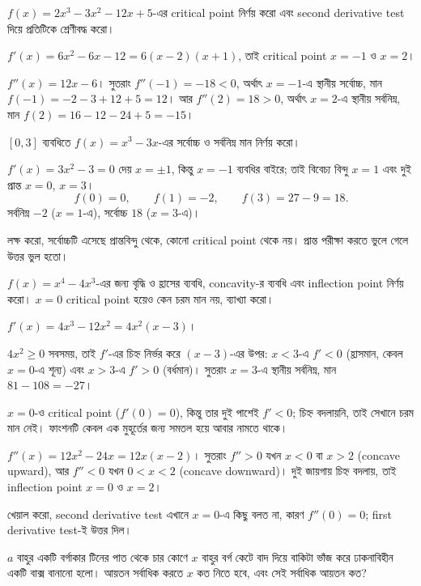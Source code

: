 \documentclass[11pt]{article}
\begin{document}
 $f(x) = 2x^{3} - 3x^{2} - 12x + 5$-এর critical point নির্ণয় করো এবং
second derivative test দিয়ে প্রতিটিকে শ্রেণীবদ্ধ করো।

\begin{sol}
$f'(x) = 6x^{2} - 6x - 12 = 6(x-2)(x+1)$, তাই critical point $x = -1$ ও
$x = 2$।

$f''(x) = 12x - 6$। সুতরাং $f''(-1) = -18 < 0$, অর্থাৎ $x=-1$-এ স্থানীয়
সর্বোচ্চ, মান $f(-1) = -2-3+12+5 = 12$। আর $f''(2) = 18 > 0$, অর্থাৎ $x=2$-এ
স্থানীয় সর্বনিম্ন, মান $f(2) = 16-12-24+5 = -15$।
\end{sol}

 $[0,3]$ ব্যবধিতে $f(x) = x^{3} - 3x$-এর সর্বোচ্চ ও সর্বনিম্ন মান
নির্ণয় করো।

\begin{sol}
$f'(x) = 3x^{2}-3 = 0$ দেয় $x = \pm 1$, কিন্তু $x=-1$ ব্যবধির বাইরে; তাই
বিবেচ্য বিন্দু $x = 1$ এবং দুই প্রান্ত $x = 0$, $x = 3$।
\[
  f(0) = 0, \qquad f(1) = -2, \qquad f(3) = 27 - 9 = 18 .
\]
সর্বনিম্ন $-2$ ($x=1$-এ), সর্বোচ্চ $18$ ($x=3$-এ)।

লক্ষ করো, সর্বোচ্চটি এসেছে প্রান্তবিন্দু থেকে, কোনো critical point থেকে নয়।
প্রান্ত পরীক্ষা করতে ভুলে গেলে উত্তর ভুল হতো।
\end{sol}

 $f(x) = x^{4} - 4x^{3}$-এর জন্য বৃদ্ধি ও হ্রাসের ব্যবধি, concavity-র
ব্যবধি এবং inflection point নির্ণয় করো। $x = 0$ critical point হয়েও কেন চরম
মান নয়, ব্যাখ্যা করো।

\begin{sol}
$f'(x) = 4x^{3} - 12x^{2} = 4x^{2}(x-3)$।

$4x^{2} \geq 0$ সবসময়, তাই $f'$-এর চিহ্ন নির্ভর করে $(x-3)$-এর উপর:
$x < 3$-এ $f' < 0$ (হ্রাসমান, কেবল $x=0$-এ শূন্য) এবং $x > 3$-এ $f' > 0$
(বর্ধমান)। সুতরাং $x = 3$-এ স্থানীয় সর্বনিম্ন, মান $81 - 108 = -27$।

$x = 0$-ও critical point ($f'(0)=0$), কিন্তু তার দুই পাশেই $f' < 0$; চিহ্ন
বদলায়নি, তাই সেখানে চরম মান নেই। ফাংশনটি কেবল এক মুহূর্তের জন্য সমতল হয়ে
আবার নামতে থাকে।

$f''(x) = 12x^{2} - 24x = 12x(x-2)$। সুতরাং $f'' > 0$ যখন $x<0$ বা $x>2$
(concave upward), আর $f'' < 0$ যখন $0<x<2$ (concave downward)। দুই জায়গায়
চিহ্ন বদলায়, তাই inflection point $x = 0$ ও $x = 2$।

খেয়াল করো, second derivative test এখানে $x=0$-এ কিছু বলত না, কারণ
$f''(0) = 0$; first derivative test-ই উত্তর দিল।
\end{sol}

 $a$ বাহুর একটি বর্গাকার টিনের পাত থেকে চার কোণে $x$ বাহুর বর্গ কেটে
বাদ দিয়ে বাকিটা ভাঁজ করে ঢাকনাবিহীন একটি বাক্স বানানো হলো। আয়তন সর্বাধিক
করতে $x$ কত নিতে হবে, এবং সেই সর্বাধিক আয়তন কত?
\end{document}
